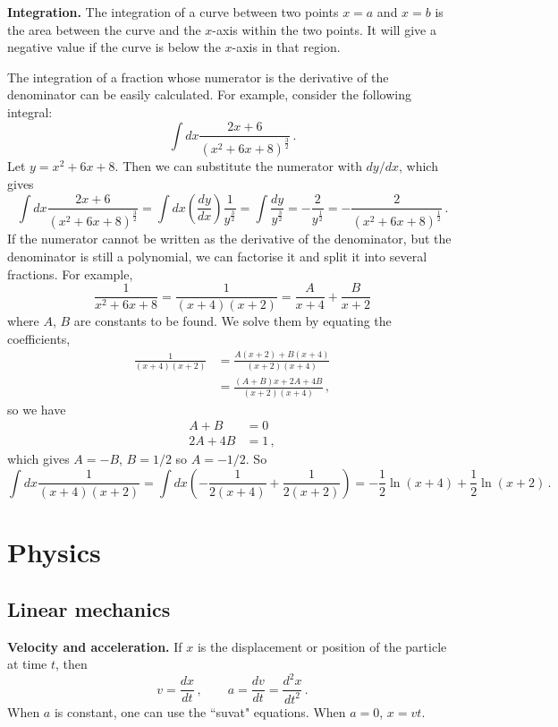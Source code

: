 \documentclass{article}
\begin{document}
\textbf{Integration.} The integration of a curve between two points $x=a$ and $x=b$ is the area between the curve and the $x$-axis within the two points. It will give a negative value if the curve is below the $x$-axis in that region.

The integration of a fraction whose numerator is the derivative of the denominator can be easily calculated. For example, consider the following integral:
\[
\int dx\frac{2x+6}{(x^2+6x+8)^\frac{3}{2}}\,.
\]
Let $y=x^2+6x+8$. Then we can substitute the numerator with $dy/dx$, which gives
\[
\int dx\frac{2x+6}{(x^2+6x+8)^\frac{3}{2}}=\int dx\left(\frac{dy}{dx}\right)\frac{1}{y^\frac{3}{2}}=\int \frac{dy}{y^\frac{3}{2}} = -\frac{2}{y^\frac{1}{2}} = -\frac{2}{(x^2+6x+8)^\frac{1}{2}}\,.
\]
If the numerator cannot be written as the derivative of the denominator, but the denominator is still a polynomial, we can factorise it and split it into several fractions. For example,
\[
\frac{1}{x^2+6x+8} = \frac{1}{(x+4)(x+2)} = \frac{A}{x+4} + \frac{B}{x+2}
\]
where $A$, $B$ are constants to be found. We solve them by equating the coefficients,
\begin{align*}
    \frac{1}{(x+4)(x+2)} &= \frac{A(x+2)+B(x+4)}{(x+2)(x+4)}\\
    &= \frac{(A+B)x+2A+4B}{(x+2)(x+4)}\,,
\end{align*}
so we have
\begin{align*}
    A+B&=0\\
    2A+4B&=1\,,
\end{align*}
which gives $A=-B$, $B=1/2$ so $A=-1/2$. So
\[
\int dx\frac{1}{(x+4)(x+2)} = \int dx\left(-\frac{1}{2(x+4)}+\frac{1}{2(x+2)}\right) = -\frac{1}{2}\ln(x+4)+\frac{1}{2}\ln(x+2)\,.
\]

\section{Physics}
\subsection{Linear mechanics}
\textbf{Velocity and acceleration.} If $x$ is the displacement or position of the particle at time $t$, then
\[
v=\frac{dx}{dt}\,,\qquad a=\frac{dv}{dt}=\frac{d^2x}{dt^2}\,.
\]
When $a$ is constant, one can use the ``suvat" equations. When $a=0$, $x=vt$.
\end{document}
